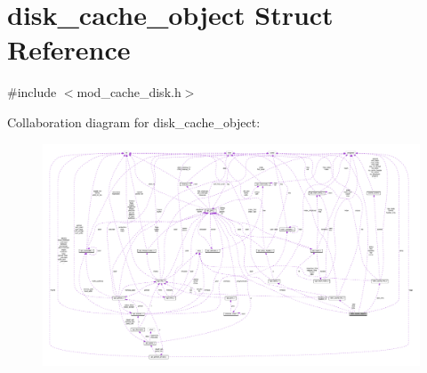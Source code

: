 \hypertarget{structdisk__cache__object}{}\section{disk\+\_\+cache\+\_\+object Struct Reference}
\label{structdisk__cache__object}


{\ttfamily \#include $<$mod\+\_\+cache\+\_\+disk.\+h$>$}



Collaboration diagram for disk\+\_\+cache\+\_\+object\+:
\nopagebreak
\begin{figure}[H]
\begin{center}
\leavevmode
\includegraphics[width=350pt]{structdisk__cache__object__coll__graph}
\end{center}
\end{figure}
